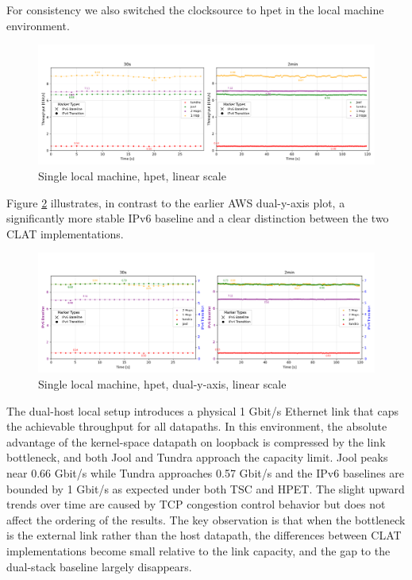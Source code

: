For consistency we also switched the clocksource to hpet in the local machine environment.

\begin{figure}[H]
    \centering
    \includegraphics[width=1\textwidth]{resources/plots/CombinedPlot/TCP/Single_tcp_sameScale_hpet_linear.png}
    \caption{Single local machine, hpet, linear scale}
    \label{fig:Local_tcp_sameScale_hpet_linear}
\end{figure}

Figure \ref{fig:Local_tcp_dualAxis_hpet_linear} illustrates, in contrast to the earlier AWS dual-y-axis plot, a significantly more stable IPv6 baseline and a clear distinction between the two CLAT implementations.

\begin{figure}[H]
    \centering
    \includegraphics[width=1\textwidth]{resources/plots/JitterPlot/Single_tcp_dualAxis_hpet_linear.png}
    \caption{Single local machine, hpet, dual-y-axis, linear scale}
    \label{fig:Local_tcp_dualAxis_hpet_linear}
\end{figure}



The dual-host local setup introduces a physical 1 Gbit/s Ethernet link that caps the achievable throughput for all datapaths. In this environment, the absolute advantage of the kernel-space datapath on loopback is compressed by the link bottleneck, and both Jool and Tundra approach the capacity limit. Jool peaks near 0.66 Gbit/s while Tundra approaches 0.57 Gbit/s and the IPv6 baselines are bounded by 1 Gbit/s as expected under both TSC and HPET. The slight upward trends over time are caused by TCP congestion control behavior but does not affect the ordering of the results. The key observation is that when the bottleneck is the external link rather than the host datapath, the differences between CLAT implementations become small relative to the link capacity, and the gap to the dual-stack baseline largely disappears.


